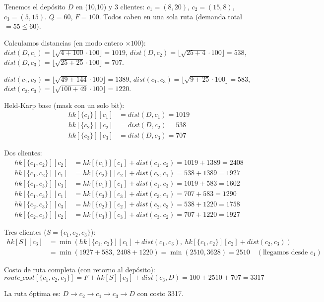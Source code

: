 \documentclass[12pt,a4paper]{article}
\begin{document}
\begin{ejemplo}
Tenemos el depósito $D$ en (10,10) y 3 clientes: $c_1=(8,20)$, $c_2=(15,8)$, $c_3=(5,15)$. $Q=60$, $F=100$. Todos caben en una sola ruta (demanda total $=55 \leq 60$).

Calculamos distancias (en modo entero $\times 100$):
$dist(D,c_1) = \lfloor\sqrt{4+100}\cdot 100\rfloor = 1019$,
$dist(D,c_2) = \lfloor\sqrt{25+4}\cdot 100\rfloor = 538$,
$dist(D,c_3) = \lfloor\sqrt{25+25}\cdot 100\rfloor = 707$.

$dist(c_1,c_2) = \lfloor\sqrt{49+144}\cdot 100\rfloor = 1389$,
$dist(c_1,c_3) = \lfloor\sqrt{9+25}\cdot 100\rfloor = 583$,
$dist(c_2,c_3) = \lfloor\sqrt{100+49}\cdot 100\rfloor = 1220$.

Held-Karp base (mask con un solo bit):
\begin{align*}
hk[\{c_1\}][c_1] &= dist(D, c_1) = 1019 \\
hk[\{c_2\}][c_2] &= dist(D, c_2) = 538 \\
hk[\{c_3\}][c_3] &= dist(D, c_3) = 707
\end{align*}

Dos clientes:
\begin{align*}
hk[\{c_1,c_2\}][c_2] &= hk[\{c_1\}][c_1] + dist(c_1,c_2) = 1019+1389 = 2408 \\
hk[\{c_1,c_2\}][c_1] &= hk[\{c_2\}][c_2] + dist(c_2,c_1) = 538+1389 = 1927 \\
hk[\{c_1,c_3\}][c_3] &= hk[\{c_1\}][c_1] + dist(c_1,c_3) = 1019+583 = 1602 \\
hk[\{c_1,c_3\}][c_1] &= hk[\{c_3\}][c_3] + dist(c_3,c_1) = 707+583 = 1290 \\
hk[\{c_2,c_3\}][c_3] &= hk[\{c_2\}][c_2] + dist(c_2,c_3) = 538+1220 = 1758 \\
hk[\{c_2,c_3\}][c_2] &= hk[\{c_3\}][c_3] + dist(c_3,c_2) = 707+1220 = 1927
\end{align*}

Tres clientes ($S = \{c_1,c_2,c_3\}$):
\begin{align*}
hk[S][c_3] &= \min(hk[\{c_1,c_2\}][c_1]+dist(c_1,c_3),\ hk[\{c_1,c_2\}][c_2]+dist(c_2,c_3)) \\
           &= \min(1927+583,\ 2408+1220) = \min(2510, 3628) = 2510 \quad (\text{llegamos desde }c_1)
\end{align*}

Costo de ruta completa (con retorno al depósito):
$$route\_cost[\{c_1,c_2,c_3\}] = F + hk[S][c_3] + dist(c_3, D) = 100 + 2510 + 707 = 3317$$

La ruta óptima es: $D \to c_2 \to c_1 \to c_3 \to D$ con costo 3317.
\end{ejemplo}
\end{document}
